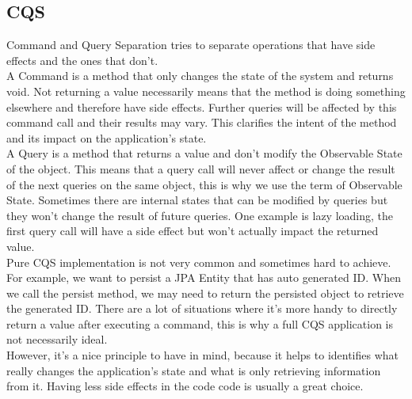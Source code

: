 \subsection{CQS}\label{subsec:cqs}
Command and Query Separation tries to separate operations that have
side effects and the ones that don't. \\
\newline
A Command is a method that only changes the state of the system and
returns void.
Not returning a value necessarily means that the method is doing
something elsewhere and therefore have side effects.
Further queries will be affected by this command call and their results
may vary.
This clarifies the intent of the method and its impact on the
application's state. \\
\newline
A Query is a method that returns a value and don't modify the
Observable State of the object.
This means that a query call will never affect or change the result of
the next queries on the same object, this is why we use the term of
Observable State.
Sometimes there are internal states that can be modified by queries but
they won't change the result of future queries.
One example is lazy loading, the first query call will have a side effect
but won't actually impact the returned value. \\
\newline
Pure CQS implementation is not very common and sometimes hard to achieve.
For example, we want to persist a JPA Entity that has auto generated
ID\@.
When we call the persist method, we may need to return the persisted
object to retrieve the generated ID\@.
There are a lot of situations where it's more handy to directly return a
value after executing a command, this is why a full CQS application is
not necessarily ideal. \\
However, it's a nice principle to have in mind, because it helps to
identifies what really changes the application's state and what is only
retrieving information from it.
Having less side effects in the code code is usually a great choice.
